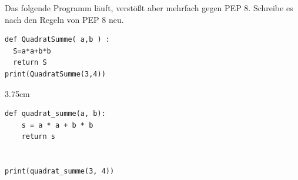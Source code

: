 \question[4]
Das folgende Programm läuft, verstößt aber mehrfach gegen PEP 8. Schreibe es nach den Regeln von PEP 8 neu.
\begin{lstlisting}
def QuadratSumme( a,b ) :
  S=a*a+b*b
  return S
print(QuadratSumme(3,4))
\end{lstlisting}
\begin{solutionbox}{3.75cm}
\begin{lstlisting}
def quadrat_summe(a, b):
    s = a * a + b * b
    return s


print(quadrat_summe(3, 4))
\end{lstlisting}
\end{solutionbox}
